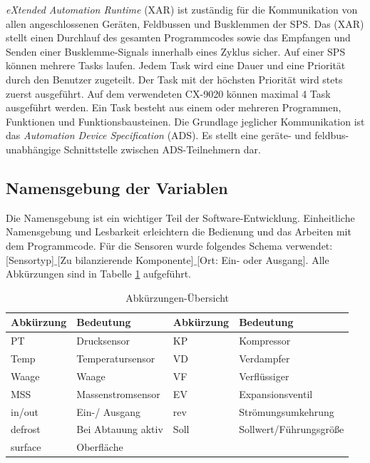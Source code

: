 \textit{eXtended Automation Runtime} (XAR) ist zuständig für die Kommunikation von allen angeschlossenen Geräten, Feldbussen und Busklemmen der SPS. Das (XAR) stellt einen Durchlauf des gesamten Programmcodes sowie das Empfangen und Senden einer Busklemme-Signals innerhalb eines Zyklus sicher. Auf einer SPS können mehrere Tasks laufen. Jedem Task wird eine Dauer und eine Priorität durch den Benutzer zugeteilt. Der Task mit der höchsten Priorität wird stets zuerst ausgeführt. Auf dem verwendeten CX-9020 können maximal 4 Task ausgeführt werden. Ein Task besteht aus einem oder mehreren Programmen, Funktionen und Funktionsbausteinen.  Die Grundlage jeglicher Kommunikation ist das \textit{Automation Device Specification} (ADS). Es stellt eine geräte- und feldbus-unabhängige Schnittstelle zwischen ADS-Teilnehmern dar. 

\subsection{Namensgebung der Variablen}
\label{subsec: Namensgebung}

Die Namensgebung ist ein wichtiger Teil der Software-Entwicklung. Einheitliche Namensgebung und Lesbarkeit erleichtern die Bedienung und das Arbeiten mit dem Programmcode. Für die Sensoren  wurde folgendes Schema verwendet: [Sensortyp]$\_$[Zu bilanzierende Komponente]$\_$[Ort: Ein- oder Ausgang]. Alle Abkürzungen sind in Tabelle \ref{tab:Abkürzungen} aufgeführt. 


\begin{table}[htb]
\centering
\caption{Abkürzungen-Übersicht}\vspace{6pt}
\begin{tabular}{llll}
\hline 
\rule[-1ex]{0pt}{2.5ex} \textbf{Abkürzung} & \textbf{Bedeutung} & \textbf{Abkürzung} & \textbf{Bedeutung} \\ 
\hline 
\hline
\rule[-1ex]{0pt}{2.5ex} PT & Drucksensor & KP & Kompressor \\ 
\hline 
\rule[-1ex]{0pt}{2.5ex} Temp & Temperatursensor & VD & Verdampfer \\ 
\hline 
\rule[-1ex]{0pt}{2.5ex} Waage & Waage & VF & Verflüssiger \\ 
\hline 
\rule[-1ex]{0pt}{2.5ex} MSS & Massenstromsensor & EV & Expansionsventil \\ 
\hline 
\rule[-1ex]{0pt}{2.5ex} in/out & Ein-/ Ausgang & rev &  Strömungsumkehrung \\ 
\hline 
\rule[-1ex]{0pt}{2.5ex} defrost & Bei Abtauung aktiv & Soll & Sollwert/Führungsgröße \\ 
\hline 
\rule[-1ex]{0pt}{2.5ex} surface & Oberfläche &  &  \\ 
\hline 
\hline
\end{tabular} 
\label{tab:Abkürzungen}
\end{table}


